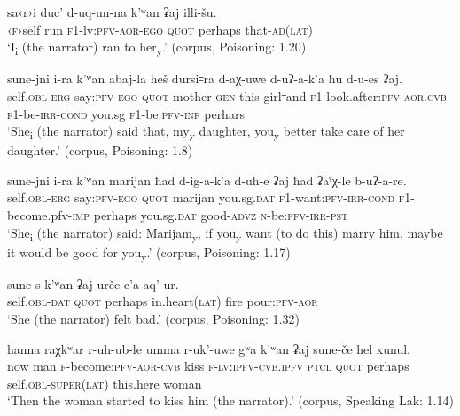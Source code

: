 ﻿\documentclass[output=paper]{langsci/langscibook}
\begin{document}
\ea %
\gll  sa‹r›i duc' d-uq-un-na k'ʷan ʡaj illi-šu.\\
‹\textsc{f}›self run \textsc{f1}-lv:\textsc{pfv}-\textsc{aor}-\textsc{ego} \textsc{quot} perhaps that-\textsc{ad}(\textsc{lat})\\
\glt `I\textsubscript{i} (the narrator) ran to her\textsubscript{y}.' (corpus, Poisoning: 1.20)


\ex %
\gll  sune-jni i-ra k'ʷan abaj-la heš dursi꞊ra d-aχ-uwe d-uʔ-a-k'a ħu d-u-es ʡaj.\\
self.\textsc{obl}-\textsc{erg} say:\textsc{pfv}-\textsc{ego} \textsc{quot} mother-\textsc{gen} this girl꞊and \textsc{f1}-look.after:\textsc{pfv}-\textsc{aor.cvb} \textsc{f1}-be-\textsc{irr}-\textsc{cond} you.sg \textsc{f1}-be:\textsc{pfv}-\textsc{inf} perhars\\ 
\glt `She\textsubscript{i} (the narrator) said that, my\textsubscript{y}
daughter, you\textsubscript{y} better take care of her daughter.' (corpus, Poisoning: 1.8)



\ex %
\gll  sune-jni i-ra k'ʷan marijan ħad d-ig-a-k'a d-uh-e ʡaj ħad ʡaˤχ-le b-uʔ-a-re.\\
self.\textsc{obl}-\textsc{erg} say:\textsc{pfv}-\textsc{ego} \textsc{quot} marijan you.sg.\textsc{dat}  \textsc{f1}-want:\textsc{pfv}-\textsc{irr}-\textsc{cond} \textsc{f1}-become.pfv-\textsc{imp} perhaps you.sg.\textsc{dat} good-\textsc{advz} \textsc{n}-be:\textsc{pfv}-\textsc{irr}-\textsc{pst}\\  
\glt `She\textsubscript{i} (the narrator) said: Marijam\textsubscript{y}, if
you\textsubscript{y} want (to do this) marry him, maybe it would be good
for you\textsubscript{y}.' (corpus, Poisoning: 1.17)


\ex %
\gll  sune-s k'ʷan ʡaj urče c'a aq'-ur.\\
self.\textsc{obl}-\textsc{dat} \textsc{quot} perhaps in.heart(\textsc{lat}) fire pour:\textsc{pfv}-\textsc{aor}\\ 
\glt `She (the narrator) felt bad.' (corpus, Poisoning: 1.32)


\ex %
\gll  hanna raχkʷar r-uh-ub-le umma r-uk'-uwe gʷa k'ʷan ʡaj sune-če hel xunul.\\
now man \textsc{f}-become:\textsc{pfv}-\textsc{aor}-\textsc{cvb} kiss \textsc{f}-\textsc{lv}:\textsc{ipfv}-\textsc{cvb.ipfv} \textsc{ptcl} \textsc{quot} perhaps self.\textsc{obl}-\textsc{super}(\textsc{lat}) this.here woman\\ 
\glt `Then the woman started to kiss him (the narrator).' (corpus, Speaking Lak: 1.14)
\z
\end{document}
